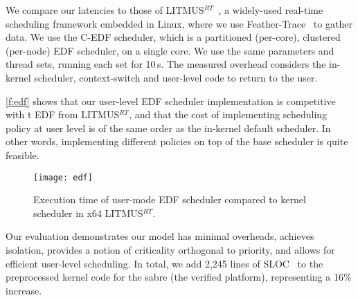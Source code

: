 We compare our latencies to those of
LITMUS$^{RT}$~\citep{Calandrino_LBDA_07}, a widely-used real-time scheduling
framework embedded in Linux, where we use Feather-Trace~\citep{Brandenburg_Anderson_07} to gather data.
We use the C-EDF scheduler, which is a partitioned (per-core), clustered (per-node) EDF scheduler, on a single
core. We use the same parameters and thread sets, running each set for 10\,s. 
The measured overhead considers the in-kernel scheduler, context-switch and user-level code to return to
the user.

\autoref{f:edf} shows that our user-level EDF scheduler implementation is
competitive with t EDF from LITMUS$^{RT}$, and
that the cost of implementing scheduling policy at user level is of
the same order as the in-kernel default scheduler. In other words,
implementing different policies on top of the base scheduler is quite feasible.

\begin{figure}[t]
    \centering
    \texttt{[image: edf]}
    \caption{Execution time of \selfour user-mode EDF scheduler compared to
             kernel scheduler in x64 LITMUS$^{RT}$.}
    \label{f:edf}
\end{figure}


Our evaluation demonstrates our model has minimal overheads, achieves isolation,  provides a notion
of criticality orthogonal to priority, and allows for efficient user-level scheduling.
In total, we add 2,245 lines of SLOC~\citep{Wheeler_01} to the preprocessed kernel code for the sabre
(the verified platform), representing a 16\% increase.

